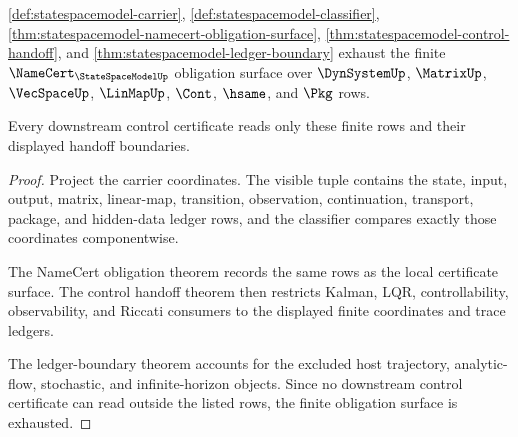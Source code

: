 \begin{theorem}
\label{thm:statespacemodel-obligation-closure}
\autoref{def:statespacemodel-carrier},
\autoref{def:statespacemodel-classifier},
\autoref{thm:statespacemodel-namecert-obligation-surface},
\autoref{thm:statespacemodel-control-handoff}, and
\autoref{thm:statespacemodel-ledger-boundary} exhaust the finite
$\NameCert_{\StateSpaceModelUp}$ obligation surface over $\DynSystemUp$,
$\MatrixUp$, $\VecSpaceUp$, $\LinMapUp$, $\Cont$, $\hsame$, and $\Pkg$ rows.

Every downstream control certificate reads only these finite rows and their
displayed handoff boundaries.
\end{theorem}
\begin{proof}
Project the carrier coordinates. The visible tuple contains the state, input,
output, matrix, linear-map, transition, observation, continuation, transport,
package, and hidden-data ledger rows, and the classifier compares exactly those
coordinates componentwise.

The NameCert obligation theorem records the same rows as the local certificate
surface. The control handoff theorem then restricts Kalman, LQR,
controllability, observability, and Riccati consumers to the displayed finite
coordinates and trace ledgers.

The ledger-boundary theorem accounts for the excluded host trajectory,
analytic-flow, stochastic, and infinite-horizon objects. Since no downstream
control certificate can read outside the listed rows, the finite obligation
surface is exhausted.
\end{proof}

